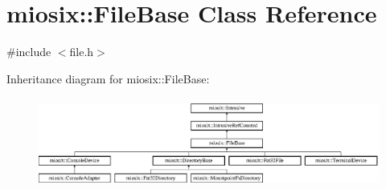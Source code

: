 \hypertarget{classmiosix_1_1_file_base}{\section{miosix\-:\-:File\-Base Class Reference}
\label{classmiosix_1_1_file_base}
}


{\ttfamily \#include $<$file.\-h$>$}

Inheritance diagram for miosix\-:\-:File\-Base\-:\begin{figure}[H]
\begin{center}
\leavevmode
\includegraphics[height=2.962963cm]{classmiosix_1_1_file_base}
\end{center}
\end{figure}
